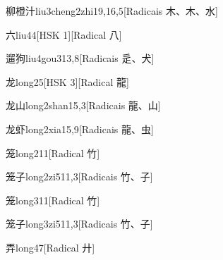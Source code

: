 \begin{entry}{柳橙汁}{liu3cheng2zhi1}{9,16,5}[Radicais ⽊、⽊、⽔]
\end{entry}

\begin{entry}{六}{liu4}{4}[HSK 1][Radical ⼋]
\end{entry}

\begin{entry}{遛狗}{liu4gou3}{13,8}[Radicais ⾡、⽝]
\end{entry}

\begin{entry}{龙}{long2}{5}[HSK 3][Radical ⿓]
\end{entry}

\begin{entry}{龙山}{long2shan1}{5,3}[Radicais ⿓、⼭]
\end{entry}

\begin{entry}{龙虾}{long2xia1}{5,9}[Radicais ⿓、⾍]
\end{entry}

\begin{entry}{笼}{long2}{11}[Radical ⽵]
\end{entry}

\begin{entry}{笼子}{long2zi5}{11,3}[Radicais ⽵、⼦]
\end{entry}

\begin{entry}{笼}{long3}{11}[Radical ⽵]
\end{entry}

\begin{entry}{笼子}{long3zi5}{11,3}[Radicais ⽵、⼦]
\end{entry}

\begin{entry}{弄}{long4}{7}[Radical ⼶]
\end{entry}

